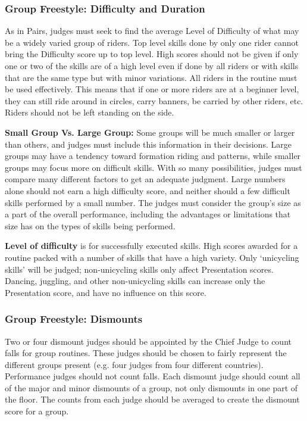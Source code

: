 \subsubsection{Group Freestyle: Difficulty and Duration \label{subsec:freestyle_group-additional-judging-criteria_difficulty-duration}}

As in Pairs, judges must seek to find the average Level of Difficulty of what may be a widely varied group of riders.
Top level skills done by only one rider cannot bring the Difficulty score up to top level.
High scores should not be given if only one or two of the skills are of a high level even if done by all riders or with skills that are the same type but with minor variations.
All riders in the routine must be used effectively.
This means that if one or more riders are at a beginner level, they can still ride around in circles, carry banners, be carried by other riders, etc.
Riders should not be left standing on the side.

\textbf{Small Group Vs. Large Group:} Some groups will be much smaller or larger than others, and judges must include this information in their decisions.
Large groups may have a tendency toward formation riding and patterns, while smaller groups may focus more on difficult skills.
With so many possibilities, judges must compare many different factors to get an adequate judgment.
Large numbers alone should not earn a high difficulty score, and neither should a few difficult skills performed by a small number.
The judges must consider the group's size as a part of the overall performance, including the advantages or limitations that size has on the types of skills being performed.

\textbf{Level of difficulty} is for successfully executed skills.
High scores awarded for a routine packed with a number of skills that have a high variety.
Only `unicycling skills' will be judged; non-unicycling skills only affect Presentation scores.
Dancing, juggling, and other non-unicycling skills can increase only the Presentation score, and have no influence on this score.

\subsubsection{Group Freestyle: Dismounts \label{subsec:freestyle_group-additional-judging-criteria_dismounts}}

Two or four dismount judges should be appointed by the Chief Judge to count falls for group routines.
These judges should be chosen to fairly represent the different groups present (e.g. four judges from four different countries).
Performance judges should not count falls.
Each dismount judge should count all of the major and minor dismounts of a group, not only dismounts in one part of the floor.
The counts from each judge should be averaged to create the dismount score for a group.


